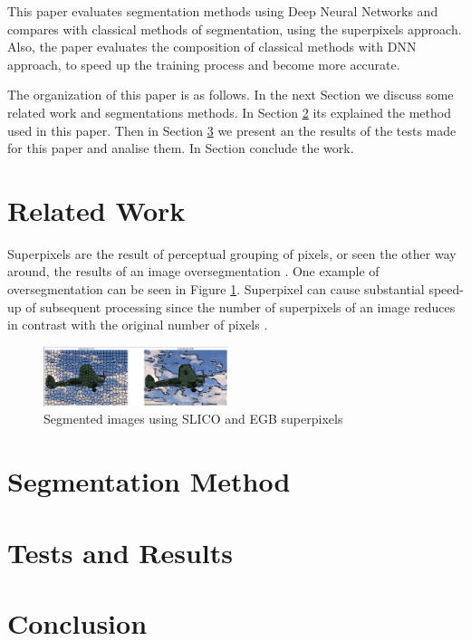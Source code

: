 \documentclass[10pt,twocolumn,letterpaper]{article}
\begin{document}
This paper evaluates segmentation methods using Deep Neural Networks and compares with classical methods of segmentation, using the superpixels approach. Also, the paper evaluates the composition of classical methods with DNN approach, to speed up the training process and become more accurate.

The organization of this paper is as follows. In the next Section we discuss some related work and segmentations methods.  In Section \ref{sec:mat_metodos} its explained the method used in this paper. Then in Section \ref{sec:testes} we present an the results of the tests made for this paper and analise them. In Section \label{sec:conclusao} conclude the work.

\section{Related Work} \label{sec:ref_teorico}

Superpixels are the result of perceptual grouping of pixels, or seen the other way around, the results of an image oversegmentation \cite{WANG201728}. One example of oversegmentation can be seen in Figure \ref{fig:superpixel}. Superpixel can cause substantial speed-up of subsequent processing since the number of superpixels of an image reduces in contrast with the original number of pixels \cite{WANG201728}.
 
\begin{figure}[ht]
  \centering
  \includegraphics[width=0.48\textwidth]{superpixels.png}
  \caption{Segmented images using SLICO and EGB superpixels}
  \label{fig:superpixel}
\end{figure}

\section{Segmentation Method} \label{sec:mat_metodos}

\section{Tests and Results} \label{sec:testes}

\section{Conclusion}


{\small


}
\end{document}
